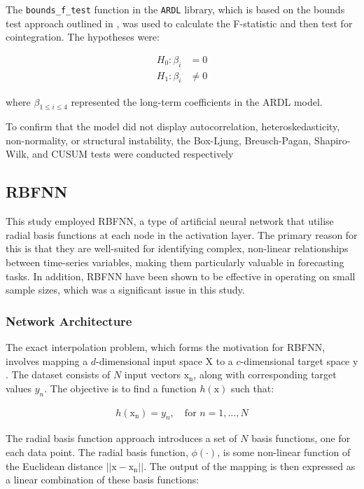 \documentclass[11pt,a4paper]{article}
\newcommand{\citeboth}[1]{\citeauthor{#1} \citep{#1}}
\begin{document}
The \texttt{{bounds\_f\_test}} function in 
the \texttt{ARDL} library, which is based on the bounds test approach 
outlined in \citeboth{pesaran2001}, was used to calculate the 
F-statistic and then test for cointegration. The hypotheses were:

\begin{align*}
    H_{0}: \beta_i &= 0\\
    H_{1}: \beta_i &\neq 0
\end{align*}

where $\beta_{1\leq i\leq4}$ represented the long-term coefficients in 
the ARDL model.

To confirm that the model did not display autocorrelation, heteroskedasticity, {non-normality}, or structural instability, the Box-Ljung, Breusch-Pagan, Shapiro-Wilk, and CUSUM tests were conducted respectively

\subsection{RBFNN}

This study employed RBFNN, 
a type of artificial neural network that utilise radial basis functions 
at each node in the activation layer. 
The primary reason for this is that they
are well-suited for identifying complex, non-linear relationships 
between time-series variables, making them particularly valuable in 
forecasting tasks. In addition, RBFNN
have been shown to be effective in operating on small sample sizes, 
which was a significant issue in this study.


\subsubsection{Network Architecture}
The exact interpolation problem, which forms the motivation for RBFNN, 
involves mapping a $d$-dimensional input space $\boldsymbol{\mathrm{X}}$ to
a $c$-dimensional target space $\boldsymbol{\mathrm{y}}$. The dataset consists of $N$ input
vectors $\boldsymbol{\mathrm{x_n}}$, along with corresponding target 
values $y_n$. The objective is to find a function
  $h(\boldsymbol{\mathrm{x}})$ such that:


\begin{align}
  h(\boldsymbol{\mathrm{x_n}}) = y_n, \quad \text{for } n = 1, \ldots, N
\end{align}

The radial basis function approach 
introduces a set of $N$ basis functions, one for each 
data point. The radial basis function, $\phi(\cdot)$, is some non-linear function of the Euclidean distance
$||\boldsymbol{\mathrm{x}} - \boldsymbol{\mathrm{x_n}}||$. The output of the mapping is then expressed as a linear combination of these basis functions:
\end{document}
